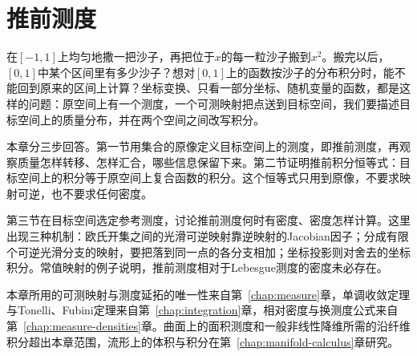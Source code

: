 \chapter{推前测度}
\label{chap:pushforward-measures}

在$[-1,1]$上均匀地撒一把沙子，再把位于$x$的每一粒沙子搬到$x^2$。搬完以后，$[0,1]$中某个区间里有多少沙子？想对$[0,1]$上的函数按沙子的分布积分时，能不能回到原来的区间上计算？坐标变换、只看一部分坐标、随机变量的函数，都是这样的问题：原空间上有一个测度，一个可测映射把点送到目标空间，我们要描述目标空间上的质量分布，并在两个空间之间改写积分。

本章分三步回答。第一节用集合的原像定义目标空间上的测度，即推前测度，再观察质量怎样转移、怎样汇合，哪些信息保留下来。第二节证明推前积分恒等式：目标空间上的积分等于原空间上复合函数的积分。这个恒等式只用到原像，不要求映射可逆，也不要求任何密度。

第三节在目标空间选定参考测度，讨论推前测度何时有密度、密度怎样计算。这里出现三种机制：欧氏开集之间的光滑可逆映射靠逆映射的Jacobian因子；分成有限个可逆光滑分支的映射，要把落到同一点的各分支相加；坐标投影则对舍去的坐标积分。常值映射的例子说明，推前测度相对于Lebesgue测度的密度未必存在。

本章所用的可测映射与测度延拓的唯一性来自第~\ref{chap:measure}章，单调收敛定理与Tonelli、Fubini定理来自第~\ref{chap:integration}章，相对密度与换测度公式来自第~\ref{chap:measure-densities}章。曲面上的面积测度和一般非线性降维所需的沿纤维积分超出本章范围，流形上的体积与积分在第~\ref{chap:manifold-calculus}章研究。





